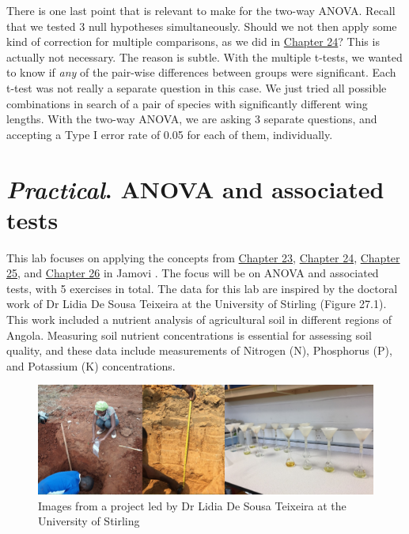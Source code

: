 \documentclass[
]{scrbook}
\begin{document}
There is one last point that is relevant to make for the two-way ANOVA.
Recall that we tested 3 null hypotheses simultaneously.
Should we not then apply some kind of correction for multiple comparisons, as we did in \protect\hyperlink{Chapter_24}{Chapter 24}?
This is actually not necessary.
The reason is subtle.
With the multiple t-tests, we wanted to know if \emph{any} of the pair-wise differences between groups were significant.
Each t-test was not really a separate question in this case.
We just tried all possible combinations in search of a pair of species with significantly different wing lengths.
With the two-way ANOVA, we are asking 3 separate questions, and accepting a Type I error rate of 0.05 for each of them, individually.

\hypertarget{Chapter_27}{%
\chapter{\texorpdfstring{\emph{Practical}. ANOVA and associated tests}{Practical. ANOVA and associated tests}}\label{Chapter_27}}

This lab focuses on applying the concepts from \protect\hyperlink{Chapter_23}{Chapter 23}, \protect\hyperlink{Chapter_24}{Chapter 24}, \protect\hyperlink{Chapter_25}{Chapter 25}, and \protect\hyperlink{Chapter_17}{Chapter 26} in Jamovi \citep{Jamovi2022}.
The focus will be on ANOVA and associated tests, with 5 exercises in total.
The data for this lab are inspired by the doctoral work of Dr Lidia De Sousa Teixeira at the University of Stirling (Figure 27.1).
This work included a nutrient analysis of agricultural soil in different regions of Angola.
Measuring soil nutrient concentrations is essential for assessing soil quality, and these data include measurements of Nitrogen (N), Phosphorus (P), and Potassium (K) concentrations.

\begin{figure}
\includegraphics[width=1\linewidth]{img/lidia_project} \caption{Images from a project led by Dr Lidia De Sousa Teixeira at the University of Stirling}\label{fig:unnamed-chunk-125}
\end{figure}
\end{document}
